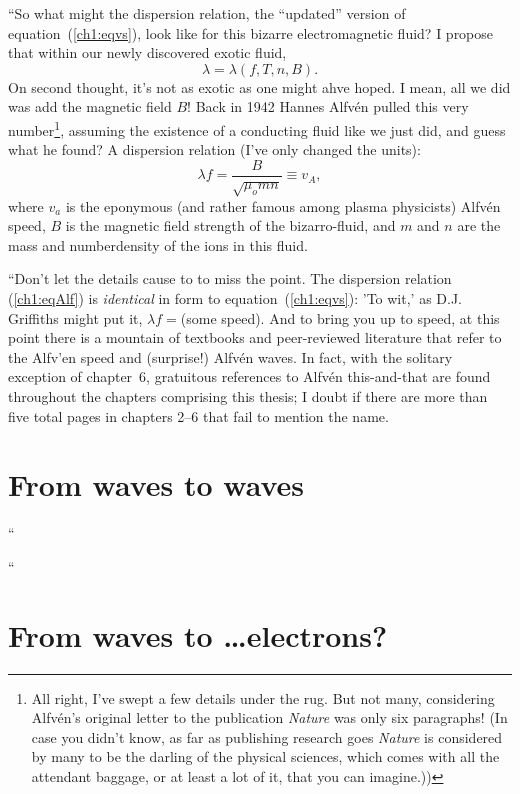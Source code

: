 \X ``So what might the dispersion relation, the ``updated'' version of
equation~(\ref{ch1:eqvs}), look like for this bizarre electromagnetic
fluid? I propose that within our newly discovered exotic fluid,
\begin{equation}
  \label{ch1:eqmhd}
  \lambda = \lambda (f, T, n, B).
\end{equation}
On second thought, it's not as exotic as one might ahve hoped. I mean,
all we did was add the magnetic field $B$! Back in 1942 Hannes
Alfv\'{e}n pulled this very number\footnote{All right, I've swept a
  few details under the rug. But not many, considering Alfv\'{e}n's
  original letter to the publication \textsl{Nature} was only six
  paragraphs! (In case you didn't know, as far as publishing research
  goes \textsl{Nature} is considered by many to be the darling of the
  physical sciences, which comes with all the attendant baggage, or at
  least a lot of it, that you can imagine.))}, assuming the existence
of a conducting fluid like we just did, and guess what he found? A
dispersion relation (I've only changed the units):
\begin{equation}
  \label{ch1:eqAlf}
  \lambda f = \frac{B}{\sqrt{\mu_o m n}} \equiv v_A,
\end{equation}
where $v_a$ is the eponymous (and rather famous among plasma
physicists) Alfv\'{e}n speed, $B$ is the magnetic field strength of
the bizarro-fluid, and $m$ and $n$ are the mass and numberdensity of
the ions in this fluid.


\X ``Don't let the details cause to to miss the point. The dispersion
relation (\ref{ch1:eqAlf}) is \emph{identical} in form to
equation~(\ref{ch1:eqvs}): 'To wit,' as D.J. Griffiths might put it, $
\lambda f = $(some speed). And to bring you up to speed, at this point
there is a mountain of textbooks and peer-reviewed literature that
refer to the Alfv'{e}n speed and (surprise!) Alfv\'{e}n waves. In
fact, with the solitary exception of chapter~6, gratuitous references
to Alfv\'{e}n this-and-that are found throughout the chapters
comprising this thesis; I doubt if there are more than five total
pages in chapters 2--6 that fail to mention the name.


\section{From waves to waves}

\X ``


\X ``

\section{From waves to \dots electrons?}

